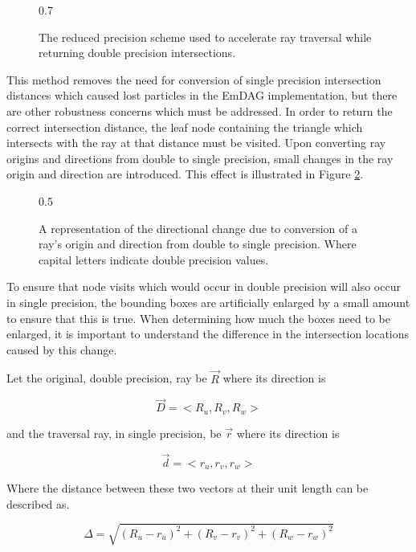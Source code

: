 \begin{figure}[H]
  \centering
  {0.7\textwidth}
  \caption{The reduced precision scheme used to accelerate ray traversal while
    returning double precision intersections.}
  \label{fig:reduced_precision_scheme}
\end{figure}

This method removes the need for conversion of single precision intersection
distances which caused lost particles in the EmDAG implementation, but there are
other robustness concerns which must be addressed. In order to return the
correct intersection distance, the leaf node containing the triangle which
intersects with the ray at that distance must be visited. Upon converting ray
origins and directions from double to single precision, small changes in the ray
origin and direction are introduced. This effect is illustrated in Figure
\ref{fig:double_to_single_ray}.

\begin{figure}
  \begin{center}
  {0.5\textwidth}
  \caption{A representation of the directional change due to conversion of a
    ray's origin and direction from double to single precision. Where capital
    letters indicate double precision values.}
  \end{center}
  \label{fig:double_to_single_ray}
\end{figure}

To ensure that node visits which would occur in double precision will also occur
in single precision, the bounding boxes are artificially enlarged by a small
amount to ensure that this is true. When determining how much the boxes need to
be enlarged, it is important to understand the difference in the intersection
locations caused by this change.

Let the original, double precision, ray be $\vec{R}$ where its direction is

$$ \vec{D} = < R_{u}, R_{v}, R_{w} > $$

and the traversal ray, in single precision, be $\vec{r}$ where its direction is

$$ \vec{d} = < r_{u}, r_{v}, r_{w} > $$

Where the distance between these two vectors at their unit length
can be described as.

$$ \Delta = \sqrt{ (R_{u} - r_{u})^{2} + (R_{v} - r_{v})^{2} + (R_{w} -
  r_{w})^{2} } $$

